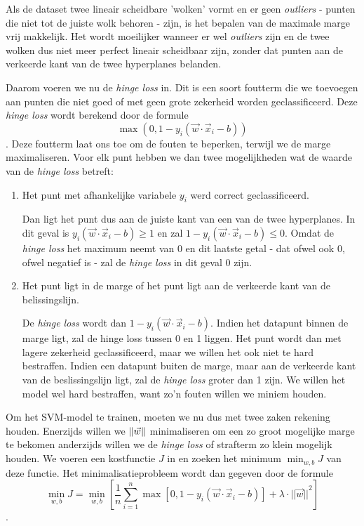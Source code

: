 \documentclass[TeamE-eindrapport]{subfiles}
\begin{document}
Als de dataset twee lineair scheidbare 'wolken' vormt en er geen \textit{outliers} - punten die niet tot de juiste wolk behoren - zijn, is het bepalen van de maximale marge vrij makkelijk. Het wordt moeilijker wanneer er wel \textit{outliers} zijn en de twee wolken dus niet meer perfect lineair scheidbaar zijn, zonder dat punten aan de verkeerde kant van de twee hyperplanes belanden.

Daarom voeren we nu de \textit{hinge loss} in. Dit is een soort foutterm die we toevoegen aan punten die niet goed of met geen grote zekerheid worden geclassificeerd. Deze \textit{hinge loss} wordt berekend door de formule \[\max{(0,1-y_i(\vec{w}\cdot\vec{x}_i-b))}\]. Deze foutterm laat ons toe om de fouten te beperken, terwijl we de marge maximaliseren. Voor elk punt hebben we dan twee mogelijkheden wat de waarde van de \textit{hinge loss} betreft:

\begin{enumerate}
	\item Het punt met afhankelijke variabele \(y_i\) werd correct geclassificeerd.
	
	Dan ligt het punt dus aan de juiste kant van een van de twee hyperplanes. In dit geval is \(y_i(\vec{w}\cdot\vec{x}_i-b)\ge1\) en zal \(1 - y_i(\vec{w}\cdot\vec{x}_i-b)\le0\). Omdat de \textit{hinge loss} het maximum neemt van 0 en dit laatste getal - dat ofwel ook 0, ofwel negatief is - zal de \textit{hinge loss} in dit geval 0 zijn.
	
	\item Het punt ligt in de marge of het punt ligt aan de verkeerde kant van de belissingslijn. 
	
	De \textit{hinge loss} wordt dan \(1 - y_i(\vec{w}\cdot\vec{x}_i - b)\). Indien het datapunt binnen de marge ligt, zal de hinge loss tussen 0 en 1 liggen. Het punt wordt dan met lagere zekerheid geclassificeerd, maar we willen het ook niet te hard bestraffen. Indien een datapunt buiten de marge, maar aan de verkeerde kant van de beslissingslijn ligt, zal de \textit{hinge loss} groter dan 1 zijn. We willen het model wel hard bestraffen, want zo'n fouten willen we miniem houden.
\end{enumerate}

Om het SVM-model te trainen, moeten we nu dus met twee zaken rekening houden. Enerzijds willen we \(\left\| \vec{w} \right\|\) minimaliseren om een zo groot mogelijke marge te bekomen anderzijds willen we de \textit{hinge loss} of strafterm zo klein mogelijk houden. We voeren een kostfunctie \(J\) in en zoeken het minimum \(\min_{w, b}J\) van deze functie. Het minimalisatieprobleem wordt dan gegeven door de formule \[\min_{w, b}J=\min_{w, b}\left[\frac{1}{n}\sum_{i=1}^n{\max{[0,1-y_i(\vec{w}\cdot\vec{x}_i-b)]}} + \lambda\cdot{||\vec{w}||}^2\right]\].
\end{document}
